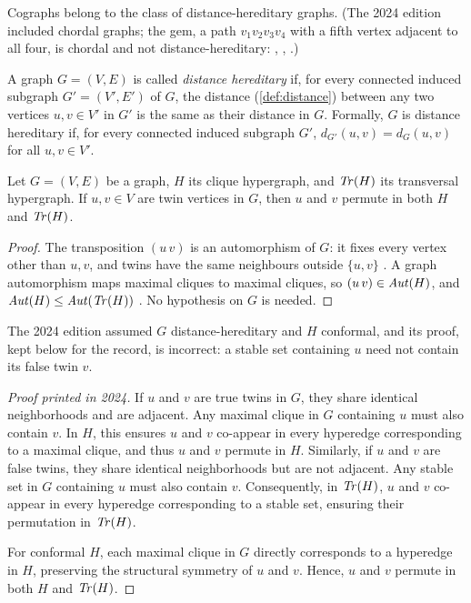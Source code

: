 Cographs belong to the class of distance-hereditary graphs. (The 2024 edition included chordal graphs; the gem, a path $v_1v_2v_3v_4$ with a fifth vertex adjacent to all four, is chordal and not distance-hereditary: , , .)

\begin{definition}
A graph $G=(V,E)$ is called \emph{distance hereditary} if, for every connected induced subgraph $G'=(V',E')$ of $G$, the distance (\ref{def:distance}) between any two vertices $u,v\in V'$ in $G'$ is the same as their distance in $G$. Formally, $G$ is distance hereditary if, for every connected induced subgraph $G'$, $d_{G'}(u,v)=d_G(u,v)$ for all $u,v\in V'$.
\end{definition}

\begin{lemma}\label{lem:twins-permute}
Let $G=(V,E)$ be a graph, $H$ its clique hypergraph, and $\mathit{Tr}(H)$ its transversal hypergraph. If $u,v\in V$ are twin vertices in $G$, then $u$ and $v$ permute in both $H$ and $\mathit{Tr}(H)$. \cite{Tim13}
\end{lemma}

\begin{proof}
The transposition $(u\,v)$ is an automorphism of $G$: it fixes every vertex other than $u,v$, and twins have the same neighbours outside $\{u,v\}$ . A graph automorphism maps maximal cliques to maximal cliques, so $(u\,v)\in\mathit{Aut}(H)$, and $\mathit{Aut}(H)\le\mathit{Aut}(\mathit{Tr}(H))$ . No hypothesis on $G$ is needed.
\end{proof}

The 2024 edition assumed $G$ distance-hereditary and $H$ conformal, and its proof, kept below for the record, is incorrect: a stable set containing $u$ need not contain its false twin $v$.

\begin{proof}[Proof printed in 2024]
If $u$ and $v$ are true twins in $G$, they share identical neighborhoods and are adjacent. Any maximal clique in $G$ containing $u$ must also contain $v$. In $H$, this ensures $u$ and $v$ co-appear in every hyperedge corresponding to a maximal clique, and thus $u$ and $v$ permute in $H$. Similarly, if $u$ and $v$ are false twins, they share identical neighborhoods but are not adjacent. Any stable set in $G$ containing $u$ must also contain $v$. Consequently, in $\mathit{Tr}(H)$, $u$ and $v$ co-appear in every hyperedge corresponding to a stable set, ensuring their permutation in $\mathit{Tr}(H)$.

For conformal $H$, each maximal clique in $G$ directly corresponds to a hyperedge in $H$, preserving the structural symmetry of $u$ and $v$. Hence, $u$ and $v$ permute in both $H$ and $\mathit{Tr}(H)$.
\end{proof}

